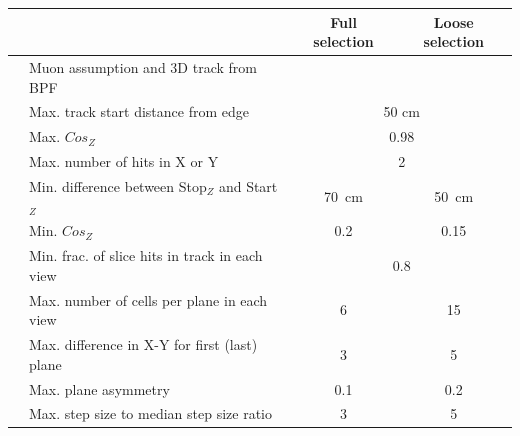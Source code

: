 \begin{table}[!ht]
\centering
\begin{tabular}{clcc}
& \centering{\textbf{Cut}} & \cellcolor[HTML]{3166FF}\textbf{Full selection} & \cellcolor[HTML]{32CB00}\textbf{Loose selection} \\ \hline
                                   & Muon assumption and 3D track from BPF         &                                             &                                          \\
                                   & Max. track start distance from edge                       & \multicolumn{2}{c}{50 cm}                                                                 \\
                                   & Max. $Cos_{Z}$                                            & \multicolumn{2}{c}{0.98}                                                               \\ \hline
                                   & Max. number of hits in X or Y                             & \multicolumn{2}{c}{\cellcolor[HTML]{FFFFFF}2}                                          \\
                                   & Min. difference between Stop$_{Z}$ and Start$_{Z}$        & \cellcolor[HTML]{3166FF}70~cm                 & \cellcolor[HTML]{32CB00}50~cm             \\
                                   & Min. $Cos_{Z}$ & \cellcolor[HTML]{3166FF}0.2                 & \cellcolor[HTML]{32CB00}0.15             \\
                                   & Min. frac. of slice hits in track in each view    & \multicolumn{2}{c}{0.8}                                                                \\
                                   & Max. number of cells per plane in each view               & \cellcolor[HTML]{3166FF}6                   & \cellcolor[HTML]{32CB00}15               \\
                                   & Max. difference in X-Y for first (last) plane     & \cellcolor[HTML]{3166FF}3                   & \cellcolor[HTML]{32CB00}5                \\
                                   & Max. plane asymmetry                                      & \cellcolor[HTML]{3166FF}0.1                 & \cellcolor[HTML]{32CB00}0.2              \\
                                   & Max. step size to median step size ratio                  & \cellcolor[HTML]{3166FF}3                   & \cellcolor[HTML]{32CB00}5                \\

\end{tabular}
\end{table}
